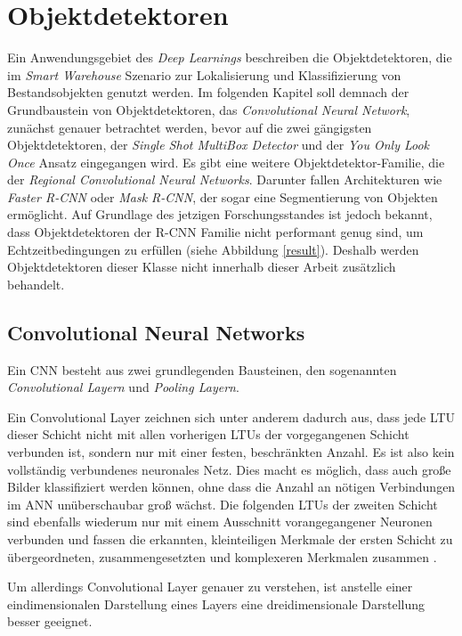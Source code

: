 \section{Objektdetektoren}

Ein Anwendungsgebiet des \textit{Deep Learnings} beschreiben die Objektdetektoren, die im \textit{Smart Warehouse} Szenario zur Lokalisierung und Klassifizierung von Bestandsobjekten genutzt werden. Im folgenden Kapitel soll demnach der Grundbaustein von Objektdetektoren, das \textit{Convolutional Neural Network}, zunächst genauer betrachtet werden, bevor auf die zwei gängigsten Objektdetektoren, der \textit{Single Shot MultiBox Detector} und der \textit{You Only Look Once} Ansatz eingegangen wird. Es gibt eine weitere Objektdetektor-Familie, die der \textit{Regional Convolutional Neural Networks}. Darunter fallen Architekturen wie \textit{Faster R-CNN} oder \textit{Mask R-CNN}, der sogar eine Segmentierung von Objekten ermöglicht. Auf Grundlage des jetzigen Forschungsstandes ist jedoch bekannt, dass Objektdetektoren der R-CNN Familie nicht performant genug sind, um Echtzeitbedingungen zu erfüllen (siehe Abbildung \ref{result}). Deshalb werden Objektdetektoren dieser Klasse nicht innerhalb dieser Arbeit zusätzlich behandelt.

\subsection*{Convolutional Neural Networks}

Ein CNN besteht aus zwei grundlegenden Bausteinen, den sogenannten \textit{Convolutional Layern} und \textit{Pooling Layern}.

Ein Convolutional Layer zeichnen sich unter anderem dadurch aus, dass jede LTU dieser Schicht nicht mit allen vorherigen LTUs der vorgegangenen Schicht verbunden ist, sondern nur mit einer festen, beschränkten Anzahl. Es ist also kein vollständig verbundenes neuronales Netz. Dies macht es möglich, dass auch große Bilder klassifiziert werden können, ohne dass die Anzahl an nötigen Verbindungen im ANN unüberschaubar groß wächst. Die folgenden LTUs der zweiten Schicht sind ebenfalls wiederum nur mit einem Ausschnitt vorangegangener Neuronen verbunden und fassen die erkannten, kleinteiligen Merkmale der ersten Schicht zu übergeordneten, zusammengesetzten und komplexeren Merkmalen zusammen \cite{AurelienGeron.2018}.

Um allerdings Convolutional Layer genauer zu verstehen, ist anstelle einer eindimensionalen Darstellung eines Layers eine dreidimensionale Darstellung besser geeignet.


